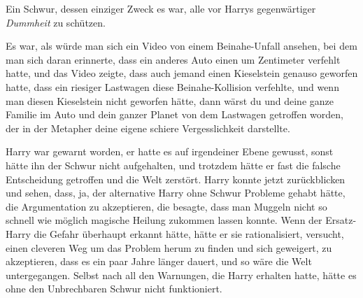 Ein Schwur, dessen einziger Zweck es war, alle vor Harrys gegenwärtiger \emph{Dummheit} zu schützen.

Es war, als würde man sich ein Video von einem Beinahe-Unfall ansehen, bei dem man sich daran erinnerte, dass ein anderes Auto einen um Zentimeter verfehlt hatte, und das Video zeigte, dass auch jemand einen Kieselstein genauso geworfen hatte, dass ein riesiger Lastwagen diese Beinahe-Kollision verfehlte, und wenn man diesen Kieselstein nicht geworfen hätte, dann wärst du und deine ganze Familie im Auto und dein ganzer Planet von dem Lastwagen getroffen worden, der in der Metapher deine eigene schiere Vergesslichkeit darstellte.

Harry war gewarnt worden, er hatte es auf irgendeiner Ebene gewusst, sonst hätte ihn der Schwur nicht aufgehalten, und trotzdem hätte er fast die falsche Entscheidung getroffen und die Welt zerstört. Harry konnte jetzt zurückblicken und sehen, dass, ja, der alternative Harry ohne Schwur Probleme gehabt hätte, die Argumentation zu akzeptieren, die besagte, dass man Muggeln nicht so schnell wie möglich magische Heilung zukommen lassen konnte. Wenn der Ersatz-Harry die Gefahr überhaupt erkannt hätte, hätte er sie rationalisiert, versucht, einen cleveren Weg um das Problem herum zu finden und sich geweigert, zu akzeptieren, dass es ein paar Jahre länger dauert, und so wäre die Welt untergegangen. Selbst nach all den Warnungen, die Harry erhalten hatte, hätte es ohne den Unbrechbaren Schwur nicht funktioniert.

